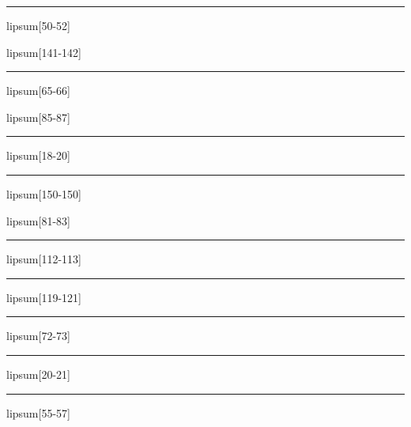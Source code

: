 \documentclass[11pt,a4paper]{article}
\begin{document}
\begin{simplewrap}
  \textcolor{cyan!19}{\rule{3.5cm}{3.8cm}}
\end{simplewrap}
lipsum[50-52]

lipsum[141-142]

\begin{simplewrap}
  \textcolor{blue!51}{\rule{4.6cm}{4.3cm}}
\end{simplewrap}
lipsum[65-66]

lipsum[85-87]

\begin{simplewrap}
  \textcolor{lime!18}{\rule{5.0cm}{3.9cm}}
\end{simplewrap}
lipsum[18-20]

\begin{simplewrap}
  \textcolor{brown!41}{\rule{4.4cm}{6.9cm}}
\end{simplewrap}
lipsum[150-150]

lipsum[81-83]

\begin{simplewrap}
  \textcolor{olive!20}{\rule{3.0cm}{4.0cm}}
\end{simplewrap}
lipsum[112-113]

\begin{simplewrap}
  \textcolor{lime!18}{\rule{5.0cm}{4.7cm}}
\end{simplewrap}
lipsum[119-121]

\begin{simplewrap}
  \textcolor{violet!41}{\rule{4.7cm}{3.4cm}}
\end{simplewrap}
lipsum[72-73]

\begin{simplewrap}
  \textcolor{purple!44}{\rule{3.6cm}{7.9cm}}
\end{simplewrap}
lipsum[20-21]

\begin{simplewrap}
  \textcolor{cyan!50}{\rule{3.1cm}{6.7cm}}
\end{simplewrap}
lipsum[55-57]
\end{document}

